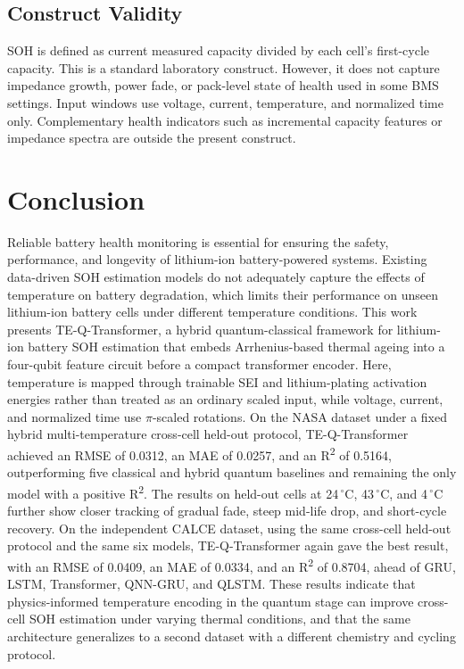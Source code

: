 \documentclass[a4paper,fleqn]{cas-sc}
\begin{document}
\subsection{Construct Validity}\label{sec:construct}
SOH is defined as current measured capacity divided by each cell's first-cycle capacity. This is a standard laboratory construct. However, it does not capture impedance growth, power fade, or pack-level state of health used in some BMS settings. 
Input windows use voltage, current, temperature, and normalized time only. Complementary health indicators such as incremental capacity features or impedance spectra are outside the present construct. 


\section{Conclusion}
\label{sec:conclusion}
Reliable battery health monitoring is essential for ensuring the safety, performance, and longevity of lithium-ion battery-powered systems. Existing data-driven SOH estimation models do not adequately capture the effects of temperature on battery degradation, which limits their performance on unseen lithium-ion battery cells under different temperature conditions.
This work presents TE-Q-Transformer, a hybrid quantum-classical framework for lithium-ion battery SOH estimation that embeds Arrhenius-based thermal ageing into a four-qubit feature circuit before a compact transformer encoder. Here, temperature is mapped through trainable SEI and lithium-plating activation energies rather than treated as an ordinary scaled input, while voltage, current, and normalized time use $\pi$-scaled rotations. On the NASA dataset under a fixed hybrid multi-temperature cross-cell held-out protocol, TE-Q-Transformer achieved an RMSE of 0.0312, an MAE of 0.0257, and an R\textsuperscript{2} of 0.5164, outperforming five classical and hybrid quantum baselines and remaining the only model with a positive R\textsuperscript{2}. 
The results on held-out cells at 24\,$^\circ$C, 43\,$^\circ$C, and 4\,$^\circ$C further show closer tracking of gradual fade, steep mid-life drop, and short-cycle recovery. 
On the independent CALCE dataset, using the same cross-cell held-out protocol and the same six models, TE-Q-Transformer again gave the best result, with an RMSE of 0.0409, an MAE of 0.0334, and an R\textsuperscript{2} of 0.8704, ahead of GRU, LSTM, Transformer, QNN-GRU, and QLSTM.
These results indicate that physics-informed temperature encoding in the quantum stage can improve cross-cell SOH estimation under varying thermal conditions, and that the same architecture generalizes to a second dataset with a different chemistry and cycling protocol. 
\end{document}
